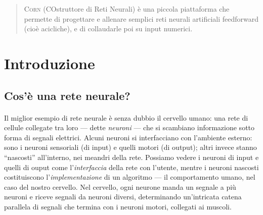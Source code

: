 \documentclass{article}
\begin{document}
\maketitle




\begin{abstract}
\textsc{Corn} (COstruttore di Reti Neurali) è una piccola piattaforma che permette di progettare e allenare semplici reti neurali artificiali feedforward (cioè acicliche), e di collaudarle poi su input numerici.
\end{abstract}




\section{Introduzione}

\subsection{Cos'è una rete neurale?}

\paragraph{} Il miglior esempio di rete neurale è senza dubbio il cervello umano: una rete di cellule collegate tra loro --- dette \emph{neuroni} --- che si scambiano informazione sotto forma di segnali elettrici. Alcuni neuroni si interfacciano con l'ambiente esterno: sono i neuroni sensoriali (di input) e quelli motori (di output); altri invece stanno “nascosti” all'interno, nei meandri della rete. Possiamo vedere i neuroni di input e quelli di ouput come l'\textit{interfaccia} della rete con l'utente, mentre i neuroni nascosti costituiscono l'\textit{implementazione} di un algoritmo --- il comportamento umano, nel caso del nostro cervello. Nel cervello, ogni neurone manda un segnale a più neuroni e riceve segnali da neuroni diversi, determinando un'intricata catena parallela di segnali che termina con i neuroni motori, collegati ai muscoli.
\end{document}

